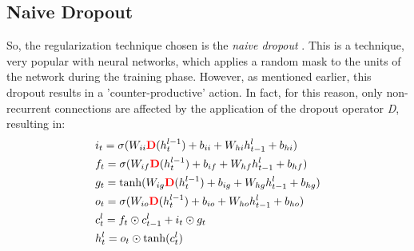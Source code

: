 \documentclass[a4paper]{article}
\begin{document}
\subsection{Naive Dropout}
So, the regularization technique chosen is the \textit{naive dropout} \cite{zaremba-rnn}. This is a technique, very popular with neural networks, which applies a random mask to the units of the network during the training phase. However, as mentioned earlier, this dropout results in a 'counter-productive' action. In fact, for this reason, only non-recurrent connections are affected by the application of the dropout operator \textit{D}, resulting in:    
\begin{equation}
    \begin{align*}
    &i_t = \sigma(W_{ii}\textbf{\textcolor{red}{D}}(h_{t}^{l-1}) + b_{ii} + W_{hi}h_{t-1}^{l} + b_{hi})\\
    &f_t = \sigma(W_{if}\textbf{\textcolor{red}{D}}(h_{t}^{l-1}) + b_{if} + W_{hf}h_{t-1}^{l} + b_{hf})\\
    &g_t = \tanh(W_{ig}\textbf{\textcolor{red}{D}}(h_{t}^{l-1}) + b_{ig} + W_{hg}h_{t-1}^{l} + b_{hg})\\
    &o_t = \sigma(W_{io}\textbf{\textcolor{red}{D}}(h_{t}^{l-1}) + b_{io} + W_{ho}h_{t-1}^{l} + b_{ho})\\
    &c_t^l = f_{t} \odot c_{t-1}^{l} + i_t \odot g_t\\
    &h_t^l = o_t \odot \tanh(c_t^l)\\
    \end{align*}
\label{naive_dropout}
\end{equation}
\end{document}

